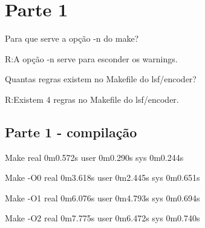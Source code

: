 \documentclass[11pt,a4paper]{article}
\begin{document}
\setlength{\parskip}{0pt}
\setlength{\parsep}{0pt}
\setlength{\headsep}{0pt}
\setlength{\topskip}{0pt}
\setlength{\topmargin}{0pt}
\setlength{\topsep}{0pt}
\setlength{\partopsep}{0pt}


\begin{minipage}{5cm}
  \vspace{2mm}
\end{minipage}

\vspace{-3mm}

\section{Parte 1}
Para que serve a opção -n do make?

R:A opção -n serve para esconder os warnings.

Quantas regras existem no Makefile do lsf/encoder?

R:Existem 4 regras no Makefile do lsf/encoder.
\subsection{Parte 1 - compilação}

Make
real	0m0.572s
user	0m0.290s
sys	0m0.244s

Make -O0
real	0m3.618s
user	0m2.445s
sys	0m0.651s

Make -O1
real	0m6.076s
user	0m4.793s
sys	0m0.694s

Make -O2
real	0m7.775s
user	0m6.472s
sys	0m0.740s
\end{document}
